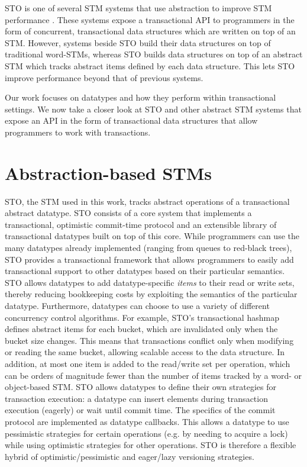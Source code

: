 STO is one of several STM systems that use abstraction to improve STM performance \cite{boost}\cite{optboost}\cite{autolock}\cite{predication}. These systems expose a transactional API to programmers in the form of concurrent, transactional data structures which are written on top of an STM. However, systems beside STO build their data structures on top of traditional word-STMs, whereas STO builds data structures on top of an abstract STM which tracks abstract items defined by each data structure. This lets STO improve performance beyond that of previous systems. 

Our work focuses on datatypes and how they perform within transactional settings. We now take a closer look at STO and other abstract STM systems that expose an API in the form of transactional data structures that allow programmers to work with transactions.

\section{Abstraction-based STMs}

STO, the STM used in this work, tracks abstract operations of a transactional abstract datatype. STO consists of a core system that implements a transactional, optimistic commit-time protocol and an extensible library of transactional datatypes built on top of this core. While programmers can use the many datatypes already implemented (ranging from queues to red-black trees), STO provides a transactional framework that allows programmers to easily add transactional support to other datatypes based on their particular semantics. STO allows datatypes to add datatype-specific \emph{items} to their read or write sets, thereby reducing bookkeeping costs by 
exploiting the semantics of the particular datatype. Furthermore, datatypes can choose to use a variety of different concurrency control algorithms. For example, STO's transactional hashmap defines abstract items for each bucket, which are invalidated only when the bucket size changes. This means that transactions conflict only when modifying or reading the same bucket, allowing scalable access to the data structure. In addition, at most one item is added to the read/write set per operation, which can be orders of magnitude fewer than the number of items tracked by a word- or object-based STM. STO allows datatypes to define their own strategies for transaction execution: a datatype can insert elements during transaction execution (eagerly) or wait until commit time. The specifics of the commit protocol are implemented as datatype callbacks. This allows a datatype to use pessimistic strategies for certain operations (e.g. by needing to acquire a lock) while using optimistic strategies for other operations. STO is therefore a flexible hybrid of optimistic/pessimistic and eager/lazy versioning strategies.


